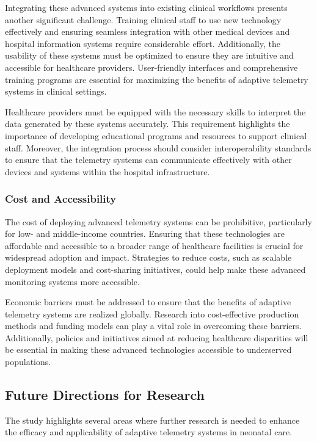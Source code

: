 \documentclass[12pt,journal,compsoc]{IEEEtran}
\begin{document}
Integrating these advanced systems into existing clinical workflows presents another significant challenge. Training clinical staff to use new technology effectively and ensuring seamless integration with other medical devices and hospital information systems require considerable effort. Additionally, the usability of these systems must be optimized to ensure they are intuitive and accessible for healthcare providers. User-friendly interfaces and comprehensive training programs are essential for maximizing the benefits of adaptive telemetry systems in clinical settings.

Healthcare providers must be equipped with the necessary skills to interpret the data generated by these systems accurately. This requirement highlights the importance of developing educational programs and resources to support clinical staff. Moreover, the integration process should consider interoperability standards to ensure that the telemetry systems can communicate effectively with other devices and systems within the hospital infrastructure.

\subsubsection{Cost and Accessibility}

The cost of deploying advanced telemetry systems can be prohibitive, particularly for low- and middle-income countries. Ensuring that these technologies are affordable and accessible to a broader range of healthcare facilities is crucial for widespread adoption and impact. Strategies to reduce costs, such as scalable deployment models and cost-sharing initiatives, could help make these advanced monitoring systems more accessible.

Economic barriers must be addressed to ensure that the benefits of adaptive telemetry systems are realized globally. Research into cost-effective production methods and funding models can play a vital role in overcoming these barriers. Additionally, policies and initiatives aimed at reducing healthcare disparities will be essential in making these advanced technologies accessible to underserved populations.

\subsection{Future Directions for Research}

The study highlights several areas where further research is needed to enhance the efficacy and applicability of adaptive telemetry systems in neonatal care.
\end{document}
